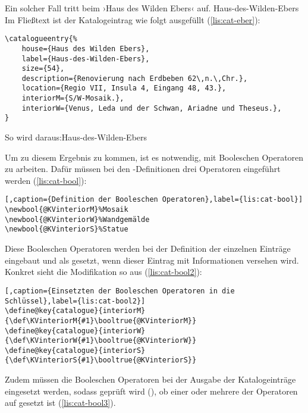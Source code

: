 Ein solcher Fall tritt beim ›Haus des Wilden Ebers‹ auf. {Haus-des-Wilden-Ebers}
Im Fließtext ist der Katalogeintrag wie folgt ausgefüllt (\cref{lis:cat-eber}):
\begin{lstlisting}[caption={Katalogeintrag für das Haus des Wilden Ebers},label={lis:cat-eber}]
\catalogueentry{%
	house={Haus des Wilden Ebers},
	label={Haus-des-Wilden-Ebers},
	size={54},
	description={Renovierung nach Erdbeben 62\,n.\,Chr.},
	location={Regio VII, Insula 4, Eingang 48, 43.},
	interiorM={S/W-Mosaik.},
	interiorW={Venus, Leda und der Schwan, Ariadne und Theseus.},
}
\end{lstlisting}
So wird daraus:{Haus-des-Wilden-Ebers}
\begin{bsp}
\end{bsp}
Um zu diesem Ergebnis zu kommen, 
ist es notwendig, mit Booleschen Operatoren zu arbeiten.
Dafür müssen bei den -Definitionen drei Operatoren eingeführt werden (\cref{lis:cat-bool}):
\begin{lstlisting}[,caption={Definition der Booleschen Operatoren},label={lis:cat-bool}]
\newbool{@KVinteriorM}%Mosaik
\newbool{@KVinteriorW}%Wandgemälde
\newbool{@KVinteriorS}%Statue
\end{lstlisting}
Diese Booleschen Operatoren werden bei der Definition der einzelnen Einträge eingebaut und als 
 gesetzt, wenn dieser Eintrag mit Informationen versehen wird.
Konkret sieht die Modifikation so aus (\cref{lis:cat-bool2}):
 \begin{lstlisting}[,caption={Einsetzten der Booleschen Operatoren in die Schlüssel},label={lis:cat-bool2}]
\define@key{catalogue}{interiorM}{\def\KVinteriorM{#1}\booltrue{@KVinteriorM}}
\define@key{catalogue}{interiorW}{\def\KVinteriorW{#1}\booltrue{@KVinteriorW}}
\define@key{catalogue}{interiorS}{\def\KVinteriorS{#1}\booltrue{@KVinteriorS}}
\end{lstlisting}
Zudem müssen die Booleschen Operatoren bei der Ausgabe der Katalogeinträge eingesetzt werden,
sodass geprüft wird (), ob einer oder mehrere der Operatoren auf  gesetzt ist (\cref{lis:cat-bool3}).
